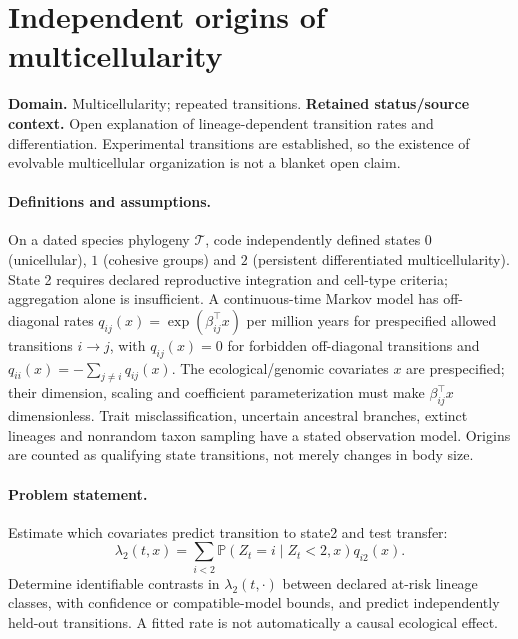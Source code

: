\documentclass[11pt]{article}
\begin{document}
\section*{Independent origins of multicellularity}
\label{prob:307}
\label{rank:199}
\par\smallskip

\noindent\textbf{Domain.} Multicellularity; repeated transitions. \quad \textbf{Retained status/source context.} Open explanation of lineage-dependent transition rates and differentiation. Experimental transitions are established, so the existence of evolvable multicellular organization is not a blanket open claim.

\paragraph{Definitions and assumptions.} On a dated species phylogeny $\mathcal T$, code independently defined states $0$ (unicellular), $1$ (cohesive groups) and $2$ (persistent differentiated multicellularity). State 2 requires declared reproductive integration and cell-type criteria; aggregation alone is insufficient. A continuous-time Markov model has off-diagonal rates $q_{ij}(x)=\exp(\beta_{ij}^{\top}x)$ per million years for prespecified allowed transitions $i\to j$, with $q_{ij}(x)=0$ for forbidden off-diagonal transitions and $q_{ii}(x)=-\sum_{j\ne i}q_{ij}(x)$. The ecological/genomic covariates $x$ are prespecified; their dimension, scaling and coefficient parameterization must make $\beta_{ij}^{\top}x$ dimensionless. Trait misclassification, uncertain ancestral branches, extinct lineages and nonrandom taxon sampling have a stated observation model. Origins are counted as qualifying state transitions, not merely changes in body size.

\paragraph{Problem statement.} Estimate which covariates predict transition to state2 and test transfer:
    \[\lambda_2(t,x)=\sum_{i<2}\mathbb{P}(Z_t=i\mid Z_t<2,x)q_{i2}(x).\]
    Determine identifiable contrasts in $\lambda_2(t,\cdot)$ between declared at-risk lineage classes, with confidence or compatible-model bounds, and predict independently held-out transitions. A fitted rate is not automatically a causal ecological effect.
\end{document}
